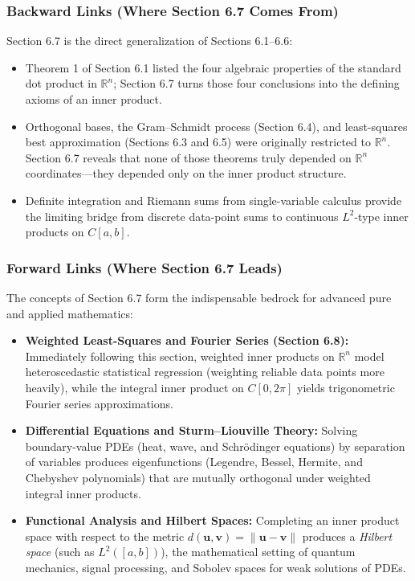 \documentclass[11pt, letterpaper]{article}
\theoremstyle{definition}
\theoremstyle{remark}
\begin{document}
\subsubsection*{Backward Links (Where Section 6.7 Comes From)}
Section 6.7 is the direct generalization of Sections 6.1--6.6:
\begin{itemize}
    \item Theorem 1 of Section 6.1 listed the four algebraic properties of the standard dot product in $\mathbb{R}^n$; Section 6.7 turns those four conclusions into the defining axioms of an inner product.
    \item Orthogonal bases, the Gram--Schmidt process (Section 6.4), and least-squares best approximation (Sections 6.3 and 6.5) were originally restricted to $\mathbb{R}^n$. Section 6.7 reveals that none of those theorems truly depended on $\mathbb{R}^n$ coordinates—they depended only on the inner product structure.
    \item Definite integration and Riemann sums from single-variable calculus provide the limiting bridge from discrete data-point sums to continuous $L^2$-type inner products on $C[a, b]$.
\end{itemize}

\subsubsection*{Forward Links (Where Section 6.7 Leads)}
The concepts of Section 6.7 form the indispensable bedrock for advanced pure and applied mathematics:
\begin{itemize}
    \item \textbf{Weighted Least-Squares and Fourier Series (Section 6.8):} Immediately following this section, weighted inner products on $\mathbb{R}^n$ model heteroscedastic statistical regression (weighting reliable data points more heavily), while the integral inner product on $C[0, 2\pi]$ yields trigonometric Fourier series approximations.
    \item \textbf{Differential Equations and Sturm--Liouville Theory:} Solving boundary-value PDEs (heat, wave, and Schr\"{o}dinger equations) by separation of variables produces eigenfunctions (Legendre, Bessel, Hermite, and Chebyshev polynomials) that are mutually orthogonal under weighted integral inner products.
    \item \textbf{Functional Analysis and Hilbert Spaces:} Completing an inner product space with respect to the metric $d(\mathbf{u}, \mathbf{v}) = \|\mathbf{u} - \mathbf{v}\|$ produces a \emph{Hilbert space} (such as $L^2([a, b])$), the mathematical setting of quantum mechanics, signal processing, and Sobolev spaces for weak solutions of PDEs.
\end{itemize}
\end{document}
